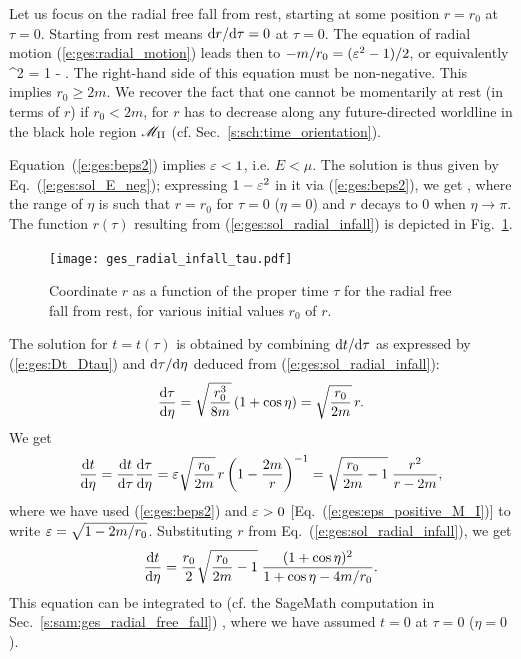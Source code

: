 Let us focus on the radial free fall from rest, starting at some
position $r=r_0$ at $\tau=0$. Starting from rest
means $\mathrm{d} r/\mathrm{d}\tau = 0$ at $\tau=0$. The equation of radial motion
(\ref{e:ges:radial_motion}) leads then to $-m/r_0 = (\varepsilon^2 - 1)/2$,
or equivalently
\be \label{e:ges:beps2}
         \veps^2 = 1 -  .
\ee
The right-hand side of this equation must be non-negative. This implies
$r_0\geq 2m$. We recover the fact that one cannot be momentarily at rest
(in terms of $r$) if $r_0<2m$, for $r$ has to decrease along any future-directed
worldline in the black hole region $\mathscr{M}_{\rm II}$ (cf. Sec.~\ref{s:sch:time_orientation}).

Equation~(\ref{e:ges:beps2}) implies $\varepsilon < 1$, i.e. $E < \mu$. The solution
is thus given by Eq.~(\ref{e:ges:sol_E_neg}); expressing $1-\varepsilon^2$
in it via (\ref{e:ges:beps2}), we get
\be \label{e:ges:sol_radial_infall}
     \leq \eta \leq \pi ,
\ee
where the range of $\eta$ is such that $r=r_0$ for $\tau=0$ ($\eta=0$) and
$r$ decays to $0$ when $\eta\rightarrow \pi$. The function $r(\tau)$ resulting
from (\ref{e:ges:sol_radial_infall}) is depicted in
Fig.~\ref{f:ges:radial_infall_tau}.

\begin{figure}
\centerline{\texttt{[image: ges\_radial\_infall\_tau.pdf]}}
\caption[]{\label{f:ges:radial_infall_tau} \footnotesize
Coordinate $r$ as a function of the proper time $\tau$
for the radial free fall from rest, for various initial values $r_0$ of $r$.}
\end{figure}

The solution for $t=t(\tau)$ is obtained by combining $\mathrm{d} t/\mathrm{d}\tau$ as expressed
by (\ref{e:ges:Dt_Dtau}) and $\mathrm{d}\tau/\mathrm{d}\eta$ deduced from (\ref{e:ges:sol_radial_infall}):
\[
    \frac{\mathrm{d}\tau}{\mathrm{d}\eta} = \sqrt{\frac{r_0^3}{8 m}}  \left( 1 + \cos\eta \right)
        = \sqrt{\frac{r_0}{2m}} \, r .
\]
We get
\[
    \frac{\mathrm{d} t}{\mathrm{d}\eta} =  \frac{\mathrm{d} t}{\mathrm{d}\tau} \frac{\mathrm{d}\tau}{\mathrm{d}\eta}
        = \varepsilon \sqrt{\frac{r_0}{2m}} \, r \left(1 - \frac{2m}{r} \right) ^{-1}
        = \sqrt{\frac{r_0}{2m} - 1} \; \frac{r^2}{r - 2m} ,
\]
where we have used (\ref{e:ges:beps2}) and $\varepsilon > 0$ [Eq.~(\ref{e:ges:eps_positive_M_I})]
to write
$\varepsilon = \sqrt{1-2m/r_0}$.
Substituting $r$ from Eq.~(\ref{e:ges:sol_radial_infall}), we get
\[
    \frac{\mathrm{d} t}{\mathrm{d}\eta} =   \frac{r_0}{2} \sqrt{\frac{r_0}{2m} - 1} \;
        \frac{(1+\cos\eta)^2}{1+\cos\eta - 4m/r_0} .
\]
This equation can be integrated to (cf. the \textsf{SageMath} computation in Sec.~\ref{s:sam:ges_radial_free_fall})
\be \label{e:ges:sol_t_radial_infall}
    ,
\ee
where we have assumed $t=0$ at $\tau=0$ ($\eta=0$).

